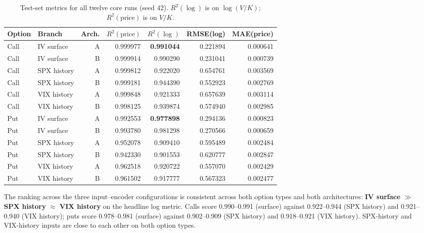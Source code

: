 \documentclass[11pt]{article}
\begin{document}
\begin{table}[t]
\centering
\small
\caption{Test-set metrics for all twelve core runs (seed 42). $R^2(\log)$ is on $\log(V/K)$;
$R^2(\text{price})$ is on $V/K$.}
\label{tab:t1}
\begin{tabular}{llrrrrr}
\toprule
Option & Branch & Arch. & $R^2(\text{price})$ & $R^2(\log)$ & RMSE(log) & MAE(price) \\
\midrule
Call & IV surface  & A & 0.999977 & \textbf{0.991044} & 0.221894 & 0.000641 \\
Call & IV surface  & B & 0.999914 & 0.990290 & 0.231041 & 0.000739 \\
Call & SPX history & A & 0.999812 & 0.922020 & 0.654761 & 0.003569 \\
Call & SPX history & B & 0.999181 & 0.944390 & 0.552923 & 0.002769 \\
Call & VIX history & A & 0.999848 & 0.921333 & 0.657639 & 0.003114 \\
Call & VIX history & B & 0.998125 & 0.939874 & 0.574940 & 0.002985 \\
\midrule
Put  & IV surface  & A & 0.992553 & \textbf{0.977898} & 0.294136 & 0.000823 \\
Put  & IV surface  & B & 0.993780 & 0.981298 & 0.270566 & 0.000659 \\
Put  & SPX history & A & 0.952078 & 0.909410 & 0.595489 & 0.002484 \\
Put  & SPX history & B & 0.942330 & 0.901553 & 0.620777 & 0.002847 \\
Put  & VIX history & A & 0.962518 & 0.920722 & 0.557070 & 0.002429 \\
Put  & VIX history & B & 0.961502 & 0.917777 & 0.567323 & 0.002477 \\
\bottomrule
\end{tabular}
\end{table}

The ranking across the three input--encoder configurations is consistent across both option types and
both architectures: \textbf{IV surface} $\gg$ \textbf{SPX history} $\approx$ \textbf{VIX history} on
the headline log metric. Calls score 0.990--0.991 (surface) against 0.922--0.944 (SPX history) and
0.921--0.940 (VIX history); puts score 0.978--0.981 (surface) against 0.902--0.909 (SPX history) and
0.918--0.921 (VIX history). SPX-history and VIX-history inputs are close to each other on both option
types.
\end{document}
